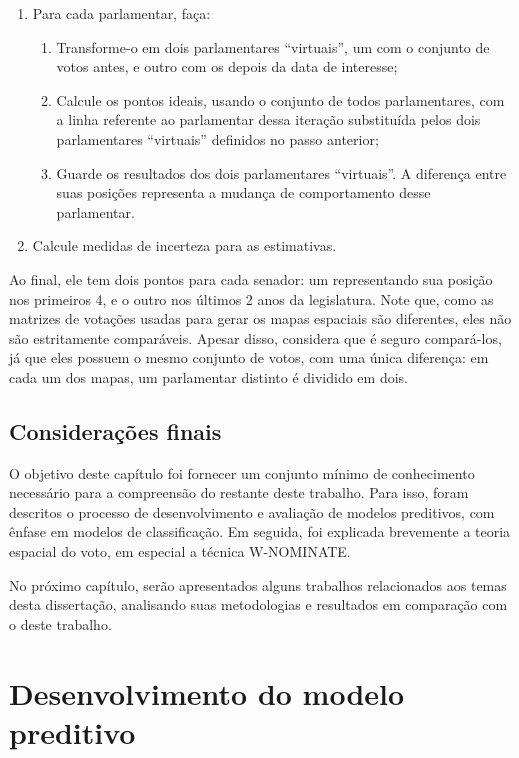 \documentclass[a4paper,titlepage]{ppgi}\usepackage[]{graphicx}\usepackage[]{color}
\begin{document}
\begin{enumerate}
  \item Para cada parlamentar, faça:
    \begin{enumerate}
      \item Transforme-o em dois parlamentares ``virtuais'', um com o conjunto
de votos antes, e outro com os depois da data de interesse;
      \item Calcule os pontos ideais, usando o conjunto de todos parlamentares,
com a linha referente ao parlamentar dessa iteração substituída pelos dois
parlamentares ``virtuais'' definidos no passo anterior;
      \item Guarde os resultados dos dois parlamentares ``virtuais''. A
diferença entre suas posições representa a mudança de comportamento desse
parlamentar.
    \end{enumerate}
  \item Calcule medidas de incerteza para as estimativas.
\end{enumerate}

Ao final, ele tem dois pontos para cada senador: um representando sua posição
nos primeiros 4, e o outro nos últimos 2 anos da legislatura. Note que, como as
matrizes de votações usadas para gerar os mapas espaciais são diferentes, eles
não são estritamente comparáveis. Apesar disso, 
considera que é seguro compará-los, já que eles possuem o mesmo conjunto de
votos, com uma única diferença: em cada um dos mapas, um parlamentar distinto
é dividido em dois.

\section{Considerações finais}

O objetivo deste capítulo foi fornecer um conjunto mínimo de conhecimento
necessário para a compreensão do restante deste trabalho. Para isso, foram
descritos o processo de desenvolvimento e avaliação de modelos preditivos,
com ênfase em modelos de classificação. Em seguida, foi explicada brevemente a
teoria espacial do voto, em especial a técnica W-NOMINATE.

No próximo capítulo, serão apresentados alguns trabalhos relacionados aos temas
desta dissertação, analisando suas metodologias e resultados em comparação com
o deste trabalho.






\chapter{Desenvolvimento do modelo preditivo}\label{cap:desenvolvimento}
\end{document}
